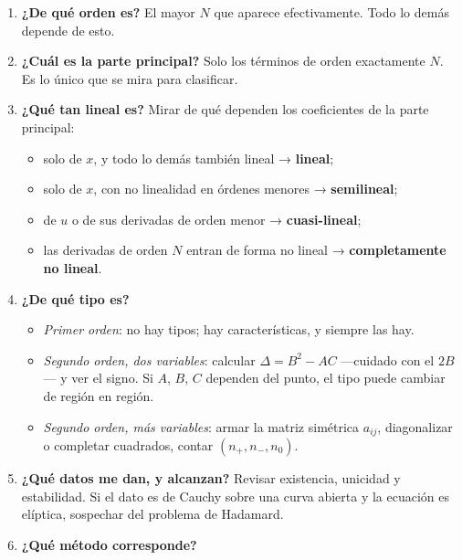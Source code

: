 \documentclass[
  spanish,
  a4paper,
]{scrbook}
\providecommand{\tightlist}{%
  \setlength{\itemsep}{0pt}\setlength{\parskip}{0pt}}
\theoremstyle{definition}
\theoremstyle{plain}
\theoremstyle{definition}
\theoremstyle{plain}
\theoremstyle{definition}
\theoremstyle{remark}
\begin{document}
\begin{enumerate}
\def\labelenumi{\arabic{enumi}.}
\tightlist
\item
  \textbf{¿De qué orden es?} El mayor \(N\) que aparece efectivamente.
  Todo lo demás depende de esto.
\item
  \textbf{¿Cuál es la parte principal?} Solo los términos de orden
  exactamente \(N\). Es lo único que se mira para clasificar.
\item
  \textbf{¿Qué tan lineal es?} Mirar de qué dependen los coeficientes de
  la parte principal:

  \begin{itemize}
  \tightlist
  \item
    solo de \(x\), y todo lo demás también lineal → \textbf{lineal};
  \item
    solo de \(x\), con no linealidad en órdenes menores →
    \textbf{semilineal};
  \item
    de \(u\) o de sus derivadas de orden menor → \textbf{cuasi-lineal};
  \item
    las derivadas de orden \(N\) entran de forma no lineal →
    \textbf{completamente no lineal}.
  \end{itemize}
\item
  \textbf{¿De qué tipo es?}

  \begin{itemize}
  \tightlist
  \item
    \emph{Primer orden}: no hay tipos; hay características, y siempre
    las hay.
  \item
    \emph{Segundo orden, dos variables}: calcular \(\Delta = B^2-AC\)
    ---cuidado con el \(2B\)--- y ver el signo. Si \(A\), \(B\), \(C\)
    dependen del punto, el tipo puede cambiar de región en región.
  \item
    \emph{Segundo orden, más variables}: armar la matriz simétrica
    \(a_{ij}\), diagonalizar o completar cuadrados, contar
    \((n_+,n_-,n_0)\).
  \end{itemize}
\item
  \textbf{¿Qué datos me dan, y alcanzan?} Revisar existencia, unicidad y
  estabilidad. Si el dato es de Cauchy sobre una curva abierta y la
  ecuación es elíptica, sospechar del problema de Hadamard.
\item
  \textbf{¿Qué método corresponde?}
\end{enumerate}
\end{document}
